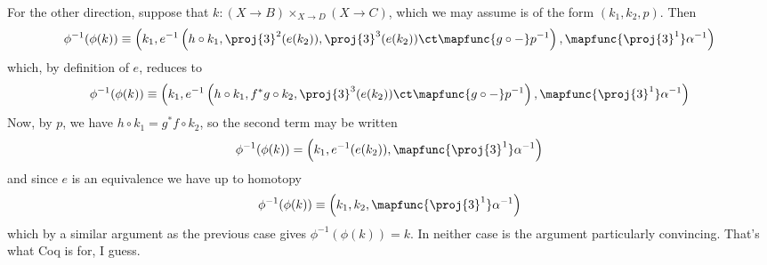 For the other direction, suppose that $k : (X \to B) \times_{X \to D} (X \to
C)$, which we may assume is of the form $(k_{1}, k_{2}, p)$.  Then
\[
  \phi^{-1}(\phi(k))
  \equiv
  \left(
    k_{1}, 
    e^{-1}\left(h \circ k_{1}, \proj{3}^{2}(e(k_{2})), 
    \proj{3}^{3}(e(k_{2})) \ct \mapfunc{g\circ-}p^{-1}
    \right),
    \mapfunc{\proj{3}^{1}}\alpha^{-1}
  \right)
\]
which, by definition of $e$, reduces to
\[
  \phi^{-1}(\phi(k))
  \equiv
  \left(
    k_{1}, 
    e^{-1}\left(h \circ k_{1}, f^{*}g \circ k_{2}, 
    \proj{3}^{3}(e(k_{2})) \ct \mapfunc{g\circ-}p^{-1}
    \right),
    \mapfunc{\proj{3}^{1}}\alpha^{-1}
  \right)
\]
Now, by $p$, we have $h \circ k_{1} = g^{*}f \circ k_{2}$, so the second term
may be written
\[
  \phi^{-1}(\phi(k))
  =
  \left(
    k_{1}, 
    e^{-1}(e(k_{2})),
    \mapfunc{\proj{3}^{1}}\alpha^{-1}
  \right)
\]
and since $e$ is an equivalence we have up to homotopy
\[
  \phi^{-1}(\phi(k))
  \equiv
  \left(
    k_{1}, 
    k_{2},
    \mapfunc{\proj{3}^{1}}\alpha^{-1}
  \right)
\]
which by a similar argument as the previous case gives $\phi^{-1}(\phi(k)) =
k$.  In neither case is the argument particularly convincing.  That's what Coq
is for, I guess.

